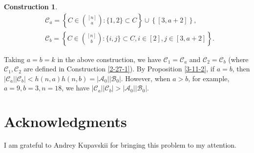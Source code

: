 \documentclass[a4paper,11pt]{article}
\newtheorem{construction}[theorem]{Construction}
\newcommand{\m}{\mathcal}
\begin{document}
\begin{construction}\label{3-11-1}
    \begin{align*}
        &\m C_a=\left\{C\in {[n]\choose a}: \{1,2\}\subset C\right\} \cup \left\{[3,a+2]\right\},\\
        &\m C_b=\left\{C\in {[n]\choose b}: \{i,j\}\subset C, i\in [2],j\in [3,a+2]\right\}.
    \end{align*}
\end{construction}

Taking $a=b=k$ in the above construction, we have $\m C_1=\m C_a$ and $\m C_2=\m C_b$ (where $\m C_1, \m C_2$ are defined in Construction \ref{2-27-1}). By Proposition \ref{3-11-2}, if $a=b$, then $|\m C_a||\m C_b|<h(n,a)h(n,b)=|\m A_0||\m B_0|$. However, when $a>b$, for example, $a=9, b=3, n=18$, we have $|\m C_a||\m C_b|>|\m A_0||\m B_0|$. 



\section*{Acknowledgments}
I am grateful to Andrey Kupavskii for bringing this problem to my attention.





\frenchspacing
\end{document}
